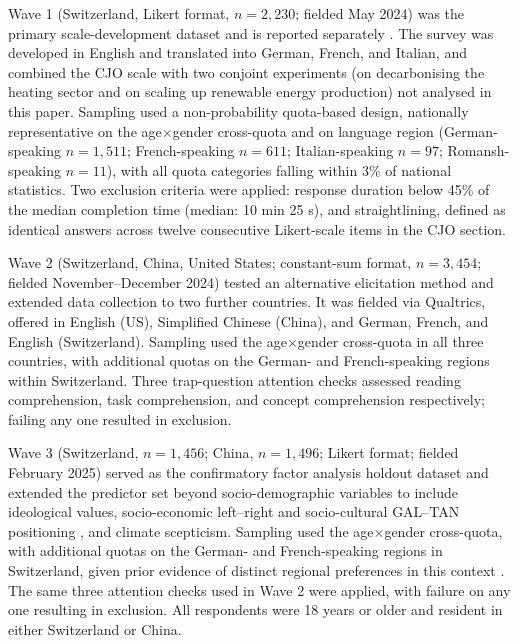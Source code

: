 \documentclass[10pt,letterpaper]{article}
\begin{document}
Wave 1 (Switzerland, Likert format, $n = 2,230$; fielded May 2024) was the primary scale-development dataset and is reported separately \autocite{joon2026}. The survey was developed in English and translated into German, French, and Italian, and combined the CJO scale with two conjoint experiments (on decarbonising the heating sector and on scaling up renewable energy production) not analysed in this paper. Sampling used a non-probability quota-based design, nationally representative on the age$\times$gender cross-quota and on language region (German-speaking $n = 1,511$; French-speaking $n = 611$; Italian-speaking $n = 97$; Romansh-speaking $n = 11$), with all quota categories falling within 3\% of national statistics. Two exclusion criteria were applied: response duration below 45\% of the median completion time (median: 10 min 25 s), and straightlining, defined as identical answers across twelve consecutive Likert-scale items in the CJO section.

Wave 2 (Switzerland, China, United States; constant-sum format, $n = 3,454$; fielded November--December 2024) tested an alternative elicitation method and extended data collection to two further countries. It was fielded via Qualtrics, offered in English (US), Simplified Chinese (China), and German, French, and English (Switzerland). Sampling used the age$\times$gender cross-quota in all three countries, with additional quotas on the German- and French-speaking regions within Switzerland. Three trap-question attention checks assessed reading comprehension, task comprehension, and concept comprehension respectively; failing any one resulted in exclusion.

Wave 3 (Switzerland, $n = 1,456$; China, $n = 1,496$; Likert format; fielded February 2025) served as the confirmatory factor analysis holdout dataset and extended the predictor set beyond socio-demographic variables to include ideological values, socio-economic left–right and socio-cultural GAL–TAN positioning \autocite{jolly2022,bornschier2021,johnston2020}, and climate scepticism. Sampling used the age$\times$gender cross-quota, with additional quotas on the German- and French-speaking regions in Switzerland, given prior evidence of distinct regional preferences in this context \autocite{joon2026}. The same three attention checks used in Wave 2 were applied, with failure on any one resulting in exclusion. All respondents were 18 years or older and resident in either Switzerland or China.
\end{document}
